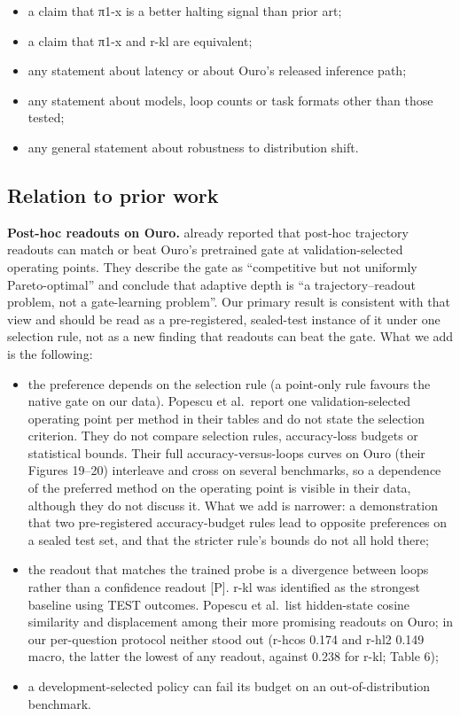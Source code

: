 \begin{itemize}
\tightlist
\item
  a claim that π1-x is a better halting signal than prior art;
\item
  a claim that π1-x and r-kl are equivalent;
\item
  any statement about latency or about Ouro's released inference path;
\item
  any statement about models, loop counts or task formats other than those tested;
\item
  any general statement about robustness to distribution shift.
\end{itemize}

\subsection{Relation to prior work}

\textbf{Post-hoc readouts on Ouro.} \citet{Popescu2026} already reported that post-hoc trajectory readouts can match or beat Ouro's
pretrained gate at validation-selected operating points. They describe the gate as ``competitive but not uniformly Pareto-optimal'' and
conclude that adaptive depth is ``a trajectory--readout problem, not a gate-learning problem''. Our primary result is consistent with that view
and should be read as a pre-registered, sealed-test instance of it under one selection rule, not as a new finding that readouts can beat the
gate. What we add is the following:

\begin{itemize}
\tightlist
\item
  the preference depends on the selection rule (a point-only rule favours the native gate on our data). Popescu et al.~report one
  validation-selected operating point per method in their tables and do not state the selection criterion. They do not compare selection
  rules, accuracy-loss budgets or statistical bounds. Their full accuracy-versus-loops curves on Ouro (their Figures 19--20) interleave and
  cross on several benchmarks, so a dependence of the preferred method on the operating point is visible in their data, although they do not
  discuss it. What we add is narrower: a demonstration that two pre-registered accuracy-budget rules lead to opposite preferences on a sealed
  test set, and that the stricter rule's bounds do not all hold there;
\item
  the readout that matches the trained probe is a divergence between loops rather than a confidence readout {[}P{]}. r-kl was identified as the strongest baseline using TEST outcomes. Popescu et al.~list hidden-state cosine similarity and displacement among their more promising readouts on Ouro; in our per-question protocol neither stood out (r-hcos 0.174 and r-hl2 0.149 macro, the latter the lowest of any readout, against 0.238 for r-kl; Table 6);
\item
  a development-selected policy can fail its budget on an out-of-distribution benchmark.
\end{itemize}

